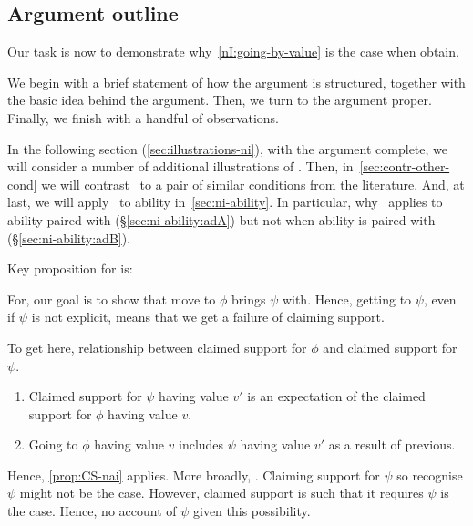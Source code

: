 \subsection*{Argument outline}

\begin{note}
  Our task is now to demonstrate why~\ref{nI:going-by-value} is the case when \nIBackground{} obtain.

  We begin with a brief statement of how the argument is structured, together with the basic idea behind the argument.
  Then, we turn to the argument proper.
  Finally, we finish with a handful of observations.

  In the following section (\ref{sec:illustrations-ni}), with the argument complete, we will consider a number of additional illustrations of \nI{}.
  Then, in~\ref{sec:contr-other-cond} we will contrast~\nI{} to a pair of similar conditions from the literature.
  And, at last, we will apply~\nI{} to ability in~\autoref{sec:ni-ability}.
  In particular, why~\nI{} applies to ability paired with \adA{} (\S\ref{sec:ni-ability:adA}) but not when ability is paired with \adB{} (\S\ref{sec:ni-ability:adB}).
\end{note}

\begin{note}
  Key proposition for \nI{} is:

  \begin{quote}
    \vspace{-\baselineskip}
    \propCSNai*
  \end{quote}

  For, our goal is to show that move to \(\phi\) brings \(\psi\) with.
  Hence, getting to \(\psi\), even if \(\psi\) is not explicit, means that we get a failure of claiming support.

  To get here, relationship between claimed support for \(\phi\) and claimed support for \(\psi\).

  \begin{enumerate}
  \item Claimed support for \(\psi\) having value \(v'\) is an expectation of the claimed support for \(\phi\) having value \(v\).
  \item Going to \(\phi\) having value \(v\) includes \(\psi\) having value \(v'\) as a result of previous.
  \end{enumerate}
  Hence, \ref{prop:CS-nai} applies.
  More broadly, \eiS{}.
  Claiming support for \(\psi\) so recognise \(\psi\) might not be the case.
  However, claimed support is such that it requires \(\psi\) is the case.
  Hence, no account of \(\psi\) given this possibility.
\end{note}

